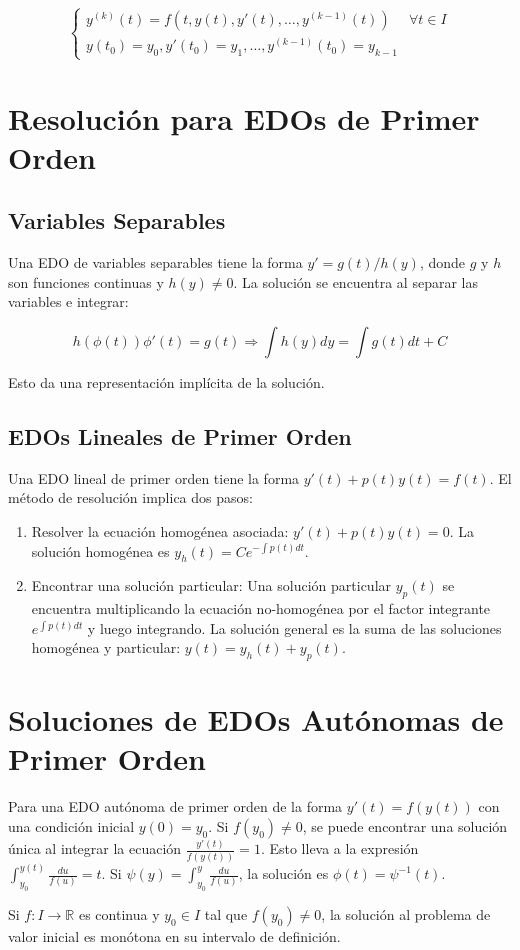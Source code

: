 \[
\begin{cases} y^{(k)}(t) = f(t, y(t), y'(t), \dots, y^{(k-1)}(t)) & \forall t \in I \\ y(t_0) = y_0, y'(t_0) = y_1, \dots, y^{(k-1)}(t_0) = y_{k-1} \end{cases}
\]

\section{Resolución para EDOs de Primer Orden}

\subsection{Variables Separables}
Una EDO de variables separables tiene la forma $y' = g(t)/h(y)$, donde $g$ y $h$ son funciones continuas y $h(y) \ne 0$. La solución se encuentra al separar las variables e integrar:

\[
  h(\phi(t))\phi'(t) = g(t) \Rightarrow \int h(y)dy = \int g(t)dt + C
\]

Esto da una representación implícita de la solución.

\subsection{EDOs Lineales de Primer Orden}
Una EDO lineal de primer orden tiene la forma $y'(t) + p(t)y(t) = f(t)$. El método de resolución implica dos pasos:

\begin{enumerate}
    \item Resolver la ecuación homogénea asociada: $y'(t) + p(t)y(t) = 0$. La solución homogénea es $y_h(t) = Ce^{-\int p(t)dt}$.
    \item Encontrar una solución particular: Una solución particular $y_p(t)$ se encuentra multiplicando la ecuación no-homogénea por el factor integrante $e^{\int p(t)dt}$ y luego integrando. La solución general es la suma de las soluciones homogénea y particular: $y(t) = y_h(t) + y_p(t)$.
\end{enumerate}

\section{Soluciones de EDOs Autónomas de Primer Orden}
Para una EDO autónoma de primer orden de la forma $y'(t) = f(y(t))$ con una condición inicial $y(0) = y_0$. Si $f(y_0) \ne 0$, se puede encontrar una solución única al integrar la ecuación $\frac{y'(t)}{f(y(t))} = 1$. Esto lleva a la expresión $\int_{y_0}^{y(t)} \frac{du}{f(u)} = t$. Si $\psi(y) = \int_{y_0}^{y} \frac{du}{f(u)}$, la solución es $\phi(t) = \psi^{-1}(t)$.
\begin{prop}
Si $f: I \rightarrow \mathbb{R}$ es continua y $y_0 \in I$ tal que $f(y_0) \ne 0$, la solución al problema de valor inicial es monótona en su intervalo de definición.
\end{prop}

